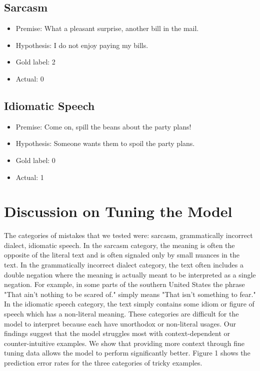 \documentclass{article}
\begin{document}
\newpage

\subsection{Sarcasm}
\begin{itemize}
	\item Premise: What a pleasant surprise, another bill in the mail.
	\item Hypothesis: I do not enjoy paying my bills.
	\item Gold label: 2
	\item Actual: 0
\end{itemize}

\subsection{Idiomatic Speech}
\begin{itemize}
	\item Premise: Come on, spill the beans about the party plans!
	\item Hypothesis: Someone wants them to spoil the party plans.
	\item Gold label: 0
	\item Actual: 1
\end{itemize}

\section{Discussion on Tuning the Model}
The categories of mistakes that we tested were:  sarcasm, grammatically incorrect dialect, idiomatic speech. In the sarcasm
category, the meaning is often the opposite of the literal text and is often signaled only by small nuances in the text.
In the grammatically incorrect dialect category, the text often includes a double negation where the meaning is actually meant
to be interpreted as a single negation. For example, in some parts of the southern United States the phrase
"That ain't nothing to be scared of." simply means "That isn't something to fear." In the idiomatic speech category,
the text simply contains some idiom or figure of speech which has a non-literal meaning. These categories are difficult
for the model to interpret because each have unorthodox or non-literal usages. Our findings suggest that the model
struggles most with context-dependent or counter-intuitive examples. We show that providing more context through fine tuning
data allows the model to perform significantly better. Figure 1 shows the prediction error rates for the three categories of
tricky examples.
\end{document}
